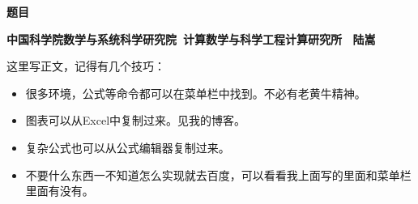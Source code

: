 \documentclass[UTF8]{ctexart}       %
\author{陆嵩}
\begin{document}


\begin{center}\textbf{题目}\end{center}
\begin{center}\textbf{中国科学院数学与系统科学研究院\ 计算数学与科学工程计算研究所 \ 陆嵩}\end{center}
这里写正文，记得有几个技巧：
\begin{itemize}
  \item  很多环境，公式等命令都可以在菜单栏中找到。不必有老黄牛精神。
  \item  图表可以从Excel中复制过来。见我的博客。
  \item  复杂公式也可以从公式编辑器复制过来。
  \item  不要什么东西一不知道怎么实现就去百度，可以看看我上面写的里面和菜单栏里面有没有。
\end{itemize}
\end{document}
